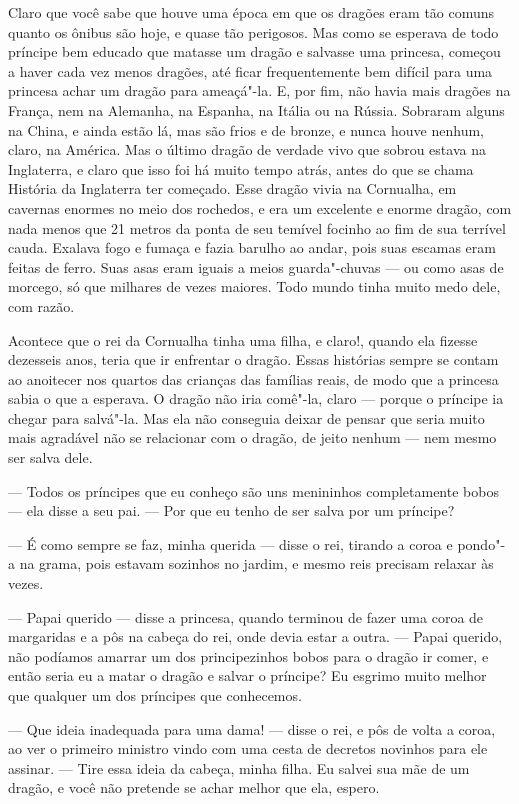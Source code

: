 Claro que você sabe que houve uma época em que os dragões eram tão
comuns quanto os ônibus são hoje, e quase tão perigosos. Mas como se
esperava de todo príncipe bem educado que
matasse um dragão e salvasse uma princesa, começou a haver cada vez
menos dragões, até ficar frequentemente bem difícil para uma princesa
achar um dragão para ameaçá"-la. E, por fim, não havia mais dragões
na França, nem na Alemanha, na Espanha, na Itália ou na Rússia.
Sobraram alguns na China, e ainda estão lá, mas são frios e de
bronze, e nunca houve nenhum, claro, na América. Mas o último dragão
de verdade vivo que sobrou estava na Inglaterra, e claro que isso foi
há muito tempo atrás, antes do que se chama História da Inglaterra
ter começado. Esse dragão vivia na Cornualha, em cavernas enormes no
meio dos rochedos, e era um excelente e enorme dragão, com nada menos
que 21 metros da ponta de seu temível focinho ao fim de sua terrível
cauda. Exalava fogo e fumaça e fazia barulho ao andar, pois suas
escamas eram feitas de ferro. Suas asas eram iguais a meios
guarda"-chuvas --- ou como asas de morcego, só que milhares de vezes
maiores. Todo mundo tinha muito medo dele, com razão.

Acontece que o rei da Cornualha tinha uma filha, e claro!, quando
ela fizesse dezesseis anos, teria que ir enfrentar o dragão. Essas histórias
sempre se contam ao anoitecer nos quartos das crianças das famílias
reais, de modo que a princesa sabia o que a esperava. O dragão não
iria comê"-la, claro --- porque o príncipe ia chegar para salvá"-la. Mas
ela não conseguia deixar de pensar que seria muito mais agradável não
se relacionar com o dragão, de jeito nenhum --- nem mesmo ser salva
dele.

--- Todos os príncipes que eu conheço são uns menininhos completamente
bobos --- ela disse a seu pai. --- Por que eu tenho de ser salva por um
príncipe?

--- É como sempre se faz, minha querida --- disse o rei, tirando a coroa e
pondo"-a na grama, pois estavam sozinhos no jardim, e mesmo reis
precisam relaxar às vezes.

--- Papai querido --- disse a princesa, quando terminou de fazer uma
coroa de margaridas e a pôs na cabeça do rei, onde devia estar a
outra. --- Papai querido, não podíamos amarrar um dos principezinhos
bobos para o dragão ir comer, e então seria eu a matar o dragão e
salvar o príncipe? Eu esgrimo muito melhor que qualquer um dos
príncipes que conhecemos. 

--- Que ideia inadequada para uma dama! --- disse o rei, e pôs de volta
a coroa, ao ver o primeiro ministro vindo com uma cesta de decretos
novinhos para ele assinar. --- Tire essa ideia da cabeça, minha filha.
Eu salvei sua mãe de um dragão, e você não pretende se achar melhor
que ela, espero.

